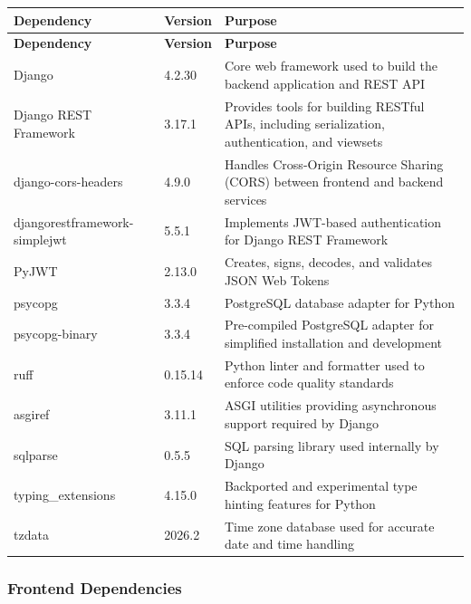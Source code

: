 \documentclass[12pt, a4paper]{article}
\begin{document}
\begin{longtable}{L{3.6cm} C{2.0cm} L{8.8cm}}
  \color{white}\bfseries Dependency &
  \color{white}\bfseries Version &
  \color{white}\bfseries Purpose \\
  \endfirsthead
  \color{white}\bfseries Dependency &
  \color{white}\bfseries Version &
  \color{white}\bfseries Purpose \\
  \endhead
  Django & 4.2.30 & Core web framework used to build the backend application and REST API \\
  Django REST Framework & 3.17.1 & Provides tools for building RESTful APIs, including serialization, authentication, and viewsets \\
  django-cors-headers & 4.9.0 & Handles Cross-Origin Resource Sharing (CORS) between frontend and backend services \\
  djangorestframework-simplejwt & 5.5.1 & Implements JWT-based authentication for Django REST Framework \\
  PyJWT & 2.13.0 & Creates, signs, decodes, and validates JSON Web Tokens \\
  psycopg & 3.3.4 & PostgreSQL database adapter for Python \\
  psycopg-binary & 3.3.4 & Pre-compiled PostgreSQL adapter for simplified installation and development \\
  ruff & 0.15.14 & Python linter and formatter used to enforce code quality standards \\
  asgiref & 3.11.1 & ASGI utilities providing asynchronous support required by Django \\
  sqlparse & 0.5.5 & SQL parsing library used internally by Django \\
  typing\_extensions & 4.15.0 & Backported and experimental type hinting features for Python \\
  tzdata & 2026.2 & Time zone database used for accurate date and time handling \\
\end{longtable}

\subsubsection{Frontend Dependencies}
\end{document}
